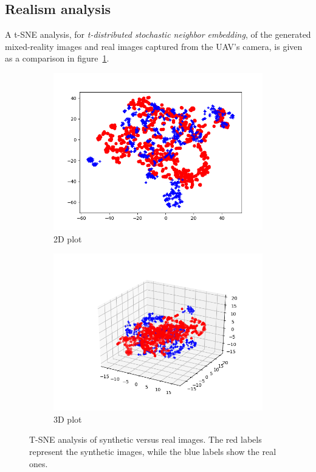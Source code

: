 \subsection{Realism analysis}

A t-SNE analysis, for \emph{t-distributed stochastic neighbor embedding}, of
the generated mixed-reality images and real images captured from the UAV's
camera, is given as a comparison in figure~\ref{fig:tsne}.

\begin{figure}[h!]
	\centering
	\begin{subfigure}[h]{0.49\textwidth}
		\includegraphics[width=\textwidth]{figure/tsne-2D.png}
		\caption{2D plot}
	\end{subfigure}
	\begin{subfigure}[h]{0.49\textwidth}
		\includegraphics[width=\textwidth]{figure/tsne-3D.png}
		\caption{3D plot}
	\end{subfigure}
	\caption[T-SNE analysis of synthetic versus real images.]{T-SNE analysis of
	synthetic versus real images. The red labels represent the synthetic
	images, while the blue labels show the real ones.} \label{fig:tsne}
\end{figure}

